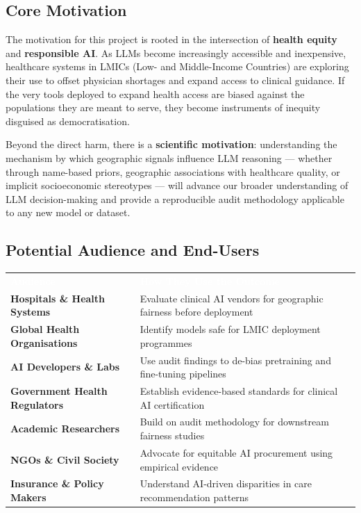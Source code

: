 \documentclass[12pt, a4paper]{article}
\begin{document}
\subsection{Core Motivation}

The motivation for this project is rooted in the intersection of \textbf{health equity} and \textbf{responsible AI}. As LLMs become increasingly accessible and inexpensive, healthcare systems in LMICs (Low- and Middle-Income Countries) are exploring their use to offset physician shortages and expand access to clinical guidance. If the very tools deployed to expand health access are biased against the populations they are meant to serve, they become instruments of inequity disguised as democratisation.

Beyond the direct harm, there is a \textbf{scientific motivation}: understanding the mechanism by which geographic signals influence LLM reasoning --- whether through name-based priors, geographic associations with healthcare quality, or implicit socioeconomic stereotypes --- will advance our broader understanding of LLM decision-making and provide a reproducible audit methodology applicable to any new model or dataset.

\subsection{Potential Audience and End-Users}

\begin{center}
\renewcommand{\arraystretch}{1.4}
\begin{tabularx}{0.95\linewidth}{>{\bfseries\small}p{3.5cm} X}
\rowcolor{rowblue}
\textcolor{white}{\textbf{Audience}} & \textcolor{white}{\textbf{How They Use the Outcome}} \\
\rowcolor{rowalt}
Hospitals \& Health Systems & Evaluate clinical AI vendors for geographic fairness before deployment \\
Global Health Organisations & Identify models safe for LMIC deployment programmes \\
\rowcolor{rowalt}
AI Developers \& Labs & Use audit findings to de-bias pretraining and fine-tuning pipelines \\
Government Health Regulators & Establish evidence-based standards for clinical AI certification \\
\rowcolor{rowalt}
Academic Researchers & Build on audit methodology for downstream fairness studies \\
NGOs \& Civil Society & Advocate for equitable AI procurement using empirical evidence \\
\rowcolor{rowalt}
Insurance \& Policy Makers & Understand AI-driven disparities in care recommendation patterns \\
\end{tabularx}
\end{center}
\end{document}
